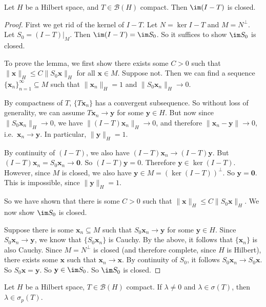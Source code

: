 \documentclass[a4paper]{article}
\begin{document}
\begin{lemma}
  Let $H$ be a Hilbert space, and $T \in \mathcal{B}(H)$ compact. Then $\im (I - T)$ is closed.
\end{lemma}

\begin{proof}
  First we get rid of the kernel of $I - T$. Let $N = \ker I - T$ and $M = N^\perp$. Let $S_0 = (I - T)|_{M}$. Then $\im (I - T) = \im S_0$. So it suffices to show $\im S_0$ is closed.

  To prove the lemma, we first show there exists some $C > 0$ such that $\|\mathbf{x}\|_H \leq C \|S_0 \mathbf{x}\|_H$ for all $\mathbf{x} \in M$. Suppose not. Then we can find a sequence $\{\mathbf{x}_n\}_{n = 1}^\infty \subseteq M$ such that $\|\mathbf{x}_n\|_H = 1$ and $\|S_0 \mathbf{x}_n\|_H \to 0$.

  By compactness of $T$, $\{T \mathbf{x}_n\}$ has a convergent subsequence. So without loss of generality, we can assume $T \mathbf{x}_n \to \mathbf{y}$ for some $\mathbf{y} \in H$. But now since $\|S_0 \mathbf{x}_n\|_H \to 0$, we have $\|(I - T) \mathbf{x}_n\|_H \to 0$, and therefore $\|\mathbf{x}_n - \mathbf{y}\| \to 0$, i.e.\ $\mathbf{x}_n \to \mathbf{y}$. In particular, $\|\mathbf{y}\|_H = 1$.

  By continuity of $(I - T)$, we also have $(I - T) \mathbf{x}_n \to (I - T) \mathbf{y}$. But $(I - T) \mathbf{x}_n = S_0 \mathbf{x}_n \to \mathbf{0}$. So $(I - T) \mathbf{y} = 0$. Therefore $\mathbf{y} \in \ker(I - T)$. However, since $M$ is closed, we also have $\mathbf{y} \in M = (\ker (I - T))^\perp$. So $\mathbf{y} = \mathbf{0}$. This is impossible, since $\|\mathbf{y}\|_H = 1$.

  So we have shown that there is some $C > 0$ such that $\|\mathbf{x}\|_H \leq C \|S_0 \mathbf{x}\|_H$. We now show $\im S_0$ is closed.

  Suppose there is some $\mathbf{x}_n \subseteq M$ such that $S_0 \mathbf{x}_n \to \mathbf{y}$ for some $\mathbf{y} \in H$. Since $S_0 \mathbf{x}_n \to \mathbf{y}$, we know that $\{S_0 \mathbf{x}_n\}$ is Cauchy. By the above, it follows that $\{\mathbf{x}_n\}$ is also Cauchy. Since $M = N^\perp$ is closed (and therefore complete, since $H$ is Hilbert), there exists some $\mathbf{x}$ such that $\mathbf{x}_n \to \mathbf{x}$. By continuity of $S_0$, it follows $S_0 \mathbf{x}_n \to S_0 \mathbf{x}$. So $S_0 \mathbf{x} = \mathbf{y}$. So $\mathbf{y} \in \im S_0$. So $\im S_0$ is closed.
\end{proof}

\begin{prop}
  Let $H$ be a Hilbert space, $T \in \mathcal{B}(H)$ compact. If $\lambda \not= 0$ and $\lambda \in \sigma(T)$, then $\lambda \in \sigma_p(T)$.
\end{prop}
\end{document}
